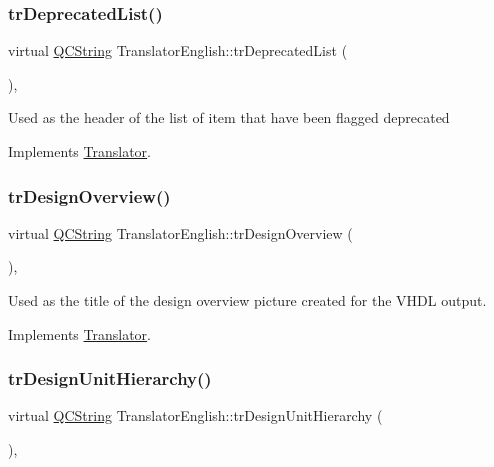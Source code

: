 \subsubsection{\texorpdfstring{trDeprecatedList()}{trDeprecatedList()}}
{\footnotesize\ttfamily virtual \mbox{\hyperlink{class_q_c_string}{Q\+C\+String}} Translator\+English\+::tr\+Deprecated\+List (\begin{DoxyParamCaption}{ }\end{DoxyParamCaption})\hspace{0.3cm}{\ttfamily [inline]}, {\ttfamily [virtual]}}

Used as the header of the list of item that have been flagged deprecated 

Implements \mbox{\hyperlink{class_translator}{Translator}}.

\mbox{\label{class_translator_english_ab1a052827b9f2896d6b74c6378b3cc36}} 
\subsubsection{\texorpdfstring{trDesignOverview()}{trDesignOverview()}}
{\footnotesize\ttfamily virtual \mbox{\hyperlink{class_q_c_string}{Q\+C\+String}} Translator\+English\+::tr\+Design\+Overview (\begin{DoxyParamCaption}{ }\end{DoxyParamCaption})\hspace{0.3cm}{\ttfamily [inline]}, {\ttfamily [virtual]}}

Used as the title of the design overview picture created for the V\+H\+DL output. 

Implements \mbox{\hyperlink{class_translator}{Translator}}.

\mbox{\label{class_translator_english_ab8e027c8ad29b332cf32e02aa37ff467}} 
\subsubsection{\texorpdfstring{trDesignUnitHierarchy()}{trDesignUnitHierarchy()}}
{\footnotesize\ttfamily virtual \mbox{\hyperlink{class_q_c_string}{Q\+C\+String}} Translator\+English\+::tr\+Design\+Unit\+Hierarchy (\begin{DoxyParamCaption}{ }\end{DoxyParamCaption})\hspace{0.3cm}{\ttfamily [inline]}, {\ttfamily [virtual]}}

